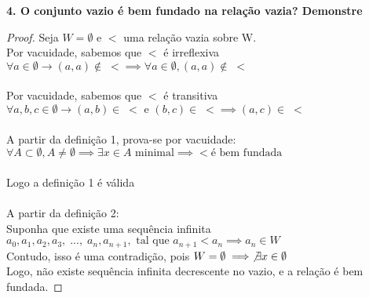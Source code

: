 \textbf{4. O conjunto vazio é bem fundado na relação vazia? Demonstre}

\begin{proof}
    Seja $W = \emptyset$ e $<$ uma relação vazia sobre W. 
    \\
    Por vacuidade, sabemos que $<$ é irreflexiva \\
    $\forall a \in \emptyset \rightarrow (a,a) \not\in \;< \implies \forall a \in \emptyset, (a,a) \not\in \;<$ \\
    \\
    Por vacuidade, sabemos que $<$ é transitiva \\
    $\forall a,b,c \in \emptyset \rightarrow (a,b) \in \;< \text{ e } (b,c) \in \;< \implies (a,c) \in \;<$
    \\
    \\
    A partir da definição 1, prova-se por vacuidade: \\
    $\forall A\subset \emptyset, A\not=\emptyset \implies \exists x \in A \text{ minimal}
    \implies < \text{é bem fundada}$\\
    \\
   Logo a definição 1 é válida\\
    \\
    A partir da definição 2: \\
    Suponha que existe uma sequência infinita $a_0, a_1, a_2, a_3, \;..., \;a_n,a_{n+1}, \text{ tal que }a_{n+1} < a_n \implies a_n \in W\;$
    \\ Contudo, isso é uma contradição, pois
    $W = \emptyset \implies \not\exists x \in \emptyset$
    \\ Logo, não existe sequência infinita decrescente no vazio, e a relação é bem fundada. 
    
\end{proof}
